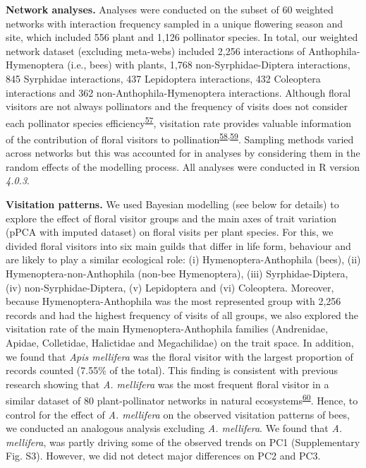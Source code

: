 \documentclass[12pt,a4paper,]{article}
\begin{document}
\textbf{Network analyses.} Analyses were conducted on the subset of 60
weighted networks with interaction frequency sampled in a unique
flowering season and site, which included 556 plant and 1,126 pollinator
species. In total, our weighted network dataset (excluding meta-webs)
included 2,256 interactions of Anthophila-Hymenoptera (i.e., bees) with
plants, 1,768 non-Syrphidae-Diptera interactions, 845 Syrphidae
interactions, 437 Lepidoptera interactions, 432 Coleoptera interactions
and 362 non-Anthophila-Hymenoptera interactions. Although floral
visitors are not always pollinators and the frequency of visits does not
consider each pollinator species
efficiency\textsuperscript{\protect\hyperlink{ref-ballantyne2015}{57}},
visitation rate provides valuable information of the contribution of
floral visitors to
pollination\textsuperscript{\protect\hyperlink{ref-vazquez2005}{58},\protect\hyperlink{ref-vazquez2012}{59}}.
Sampling methods varied across networks but this was accounted for in
analyses by considering them in the random effects of the modelling
process. All analyses were conducted in R version \emph{4.0.3}.

\textbf{Visitation patterns.} We used Bayesian modelling (see below for
details) to explore the effect of floral visitor groups and the main
axes of trait variation (pPCA with imputed dataset) on floral visits per
plant species. For this, we divided floral visitors into six main guilds
that differ in life form, behaviour and are likely to play a similar
ecological role: (i) Hymenoptera-Anthophila (bees), (ii)
Hymenoptera-non-Anthophila (non-bee Hymenoptera), (iii)
Syrphidae-Diptera, (iv) non-Syrphidae-Diptera, (v) Lepidoptera and (vi)
Coleoptera. Moreover, because Hymenoptera-Anthophila was the most
represented group with 2,256 records and had the highest frequency of
visits of all groups, we also explored the visitation rate of the main
Hymenoptera-Anthophila families (Andrenidae, Apidae, Colletidae,
Halictidae and Megachilidae) on the trait space. In addition, we found
that \emph{Apis mellifera} was the floral visitor with the largest
proportion of records counted (7.55\% of the total). This finding is
consistent with previous research showing that \emph{A. mellifera} was
the most frequent floral visitor in a similar dataset of 80
plant-pollinator networks in natural
ecosystems\textsuperscript{\protect\hyperlink{ref-hung2018}{60}}. Hence,
to control for the effect of \emph{A. mellifera} on the observed
visitation patterns of bees, we conducted an analogous analysis
excluding \emph{A. mellifera}. We found that \emph{A. mellifera}, was
partly driving some of the observed trends on PC1 (Supplementary Fig.
S3). However, we did not detect major differences on PC2 and PC3.
\end{document}
